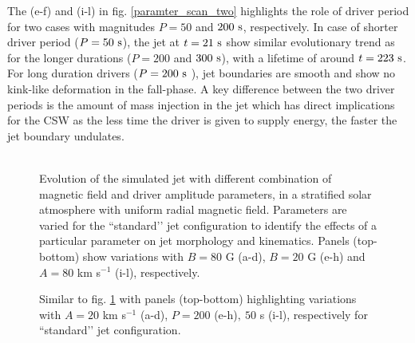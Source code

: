 \documentclass[12pt]{ociamthesis}
\newcommand{\fref}[1]{fig. \ref{#1}}
\newcommand{\np}{\\ \\}
\begin{document}
The (e-f) and (i-l) in fig. \eqref{paramter_scan_two} highlights the role of driver period for two cases with magnitudes $P = 50$ and $200~\rm{s}$, respectively. In case of shorter driver period ($P = 50 ~\rm{s}$), the jet at $t = 21~\rm{s}$ show similar evolutionary trend as for the longer durations ($P = 200$ and $300~\rm{s}$), with a lifetime of around $t = 223~\rm{s}$. For long duration drivers ($P = 200~\rm{s}$ ), jet boundaries are smooth and show no kink-like deformation in the fall-phase. A key difference between the two driver periods is the amount of mass injection in the jet which has direct implications for the CSW as the less time the driver is given to supply energy, the faster the jet boundary undulates. \np
\begin{figure}
\captionsetup[subfigure]{labelformat=empty}
\centering
{} 
\caption{Evolution of the simulated jet with different combination of magnetic field and driver amplitude parameters, in a stratified solar atmosphere with uniform radial magnetic field. Parameters are varied for the ``standard’’ jet configuration to identify the effects of a particular parameter on jet morphology and kinematics. Panels (top-bottom) show variations with $B = 80$ G (a-d), $B = 20$ G  (e-h) and $A = 80$ km s$^{-1}$ (i-l), respectively.}
\label{paramter_scan_one}
\end{figure}
\begin{figure}
\captionsetup[subfigure]{labelformat=empty}
\centering
{} 
\caption{Similar to \fref{paramter_scan_one} with panels (top-bottom) highlighting variations with $A = 20$ km s$^{-1}$ (a-d), $P = 200$ (e-h)$,~50$ s (i-l), respectively for ``standard’’ jet configuration.}
\label{paramter_scan_two}
\end{figure}
\end{document}
